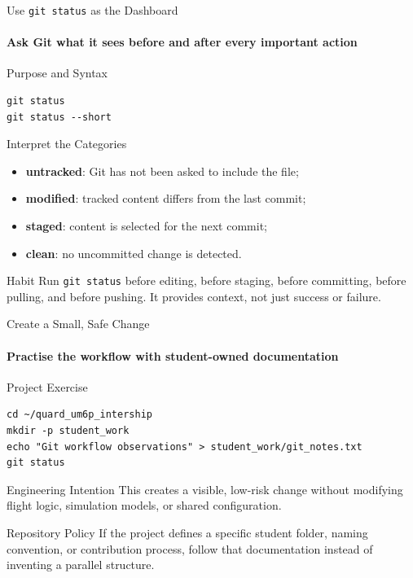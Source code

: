 \begin{frame}[fragile]{Use \texttt{git status} as the Dashboard}
\framesubtitle{Ask Git what it sees before and after every important action}
\footnotesize
\begin{block}{Purpose and Syntax}
\begin{verbatim}
git status
git status --short
\end{verbatim}
\end{block}
\begin{exampleblock}{Interpret the Categories}
\begin{itemize}\setlength{\itemsep}{0.18em}
\item \textbf{untracked}: Git has not been asked to include the file;
\item \textbf{modified}: tracked content differs from the last commit;
\item \textbf{staged}: content is selected for the next commit;
\item \textbf{clean}: no uncommitted change is detected.
\end{itemize}
\end{exampleblock}
\begin{alertblock}{Habit}
Run \texttt{git status} before editing, before staging, before committing, before pulling, and before pushing. It provides context, not just success or failure.
\end{alertblock}
\end{frame}

\begin{frame}[fragile]{Create a Small, Safe Change}
\framesubtitle{Practise the workflow with student-owned documentation}
\footnotesize
\begin{exampleblock}{Project Exercise}
\begin{verbatim}
cd ~/quard_um6p_intership
mkdir -p student_work
echo "Git workflow observations" > student_work/git_notes.txt
git status
\end{verbatim}
\end{exampleblock}
\begin{block}{Engineering Intention}
This creates a visible, low-risk change without modifying flight logic, simulation models, or shared configuration.
\end{block}
\begin{alertblock}{Repository Policy}
If the project defines a specific student folder, naming convention, or contribution process, follow that documentation instead of inventing a parallel structure.
\end{alertblock}
\end{frame}

